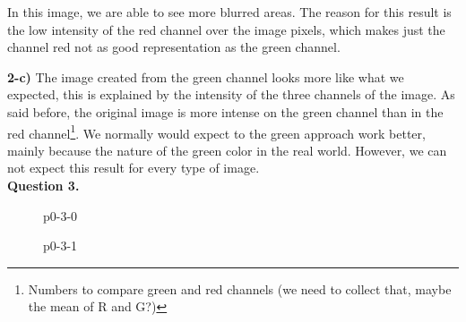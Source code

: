 \documentclass[12pt,a4paper]{article}
\begin{document}
In this image, we are able to see more blurred areas. The reason for this result is the low intensity of the red channel over the image pixels, which makes just the channel red not as good representation as the green channel.

\textbf{2-c) } The image created from the green channel looks more like what we expected, this is explained by the intensity of the three channels of the image. As said before, the original image is more intense on the green channel than in the red channel\footnote{Numbers to compare green and red channels (we need to collect that, maybe the mean of R and G?)}. We normally would expect to the green approach work better, mainly because the nature of the green color in the real world. However, we can not expect this result for every type of image. \\

\textbf{Question 3.} \\

\begin{figure}[!h]
	\centering
	{%
		\setlength{\fboxsep}{1pt}%
		\setlength{\fboxrule}{1pt}%
	}%
	\caption{p0-3-0}
	\label{fig:p0-3-0}
\end{figure}


\begin{figure}[!h]
	\centering
	{%
		\setlength{\fboxsep}{1pt}%
		\setlength{\fboxrule}{1pt}%
	}%
	\caption{p0-3-1}
	\label{fig:p0-3-1}
\end{figure}
\end{document}
